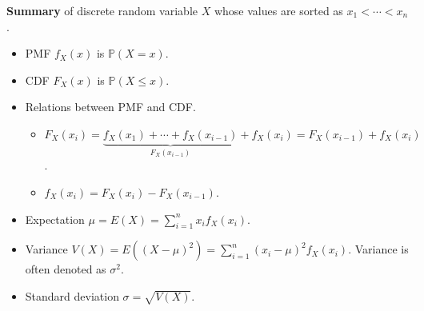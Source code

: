\documentclass[../main.tex]{subfiles}
\begin{document}
\bigskip

\textbf{Summary} of discrete random variable \(X\) whose values are sorted as \(x_{1} < \cdots < x_{n}\).
\begin{itemize}
  \item PMF \(f_{X}(x)\) is \(\mathbb{P}(X = x)\).
  \item CDF \(F_{X}(x)\) is \(\mathbb{P}(X \le x)\).
  \item Relations between PMF and CDF.
    \begin{itemize}
      \item \(F_{X}(x_{i}) = \underbrace{f_{X}(x_{1}) + \cdots + f_{X}(x_{i-1})}_{F_{X}(x_{i-1})} + f_{X}(x_{i}) = F_{X}(x_{i-1}) + f_{X}(x_{i})\).
      \item \(f_{X}(x_{i}) = F_{X}(x_{i}) - F_{X}(x_{i-1})\).
    \end{itemize}
  \item Expectation \(\mu = E(X) = \sum_{i=1}^{n} x_{i} f_{X}(x_{i})\).
  \item Variance \(V(X) = E\left( (X - \mu)^{2} \right) = \sum_{i=1}^{n} (x_{i} - \mu)^{2} f_{X}(x_{i})\). Variance is often denoted as \(\sigma^{2}\).
  \item Standard deviation \(\sigma = \sqrt{V(X)}\).
\end{itemize}
\end{document}
